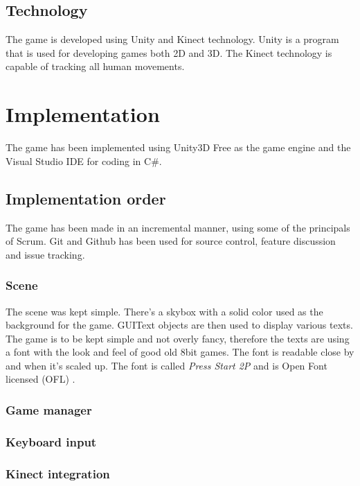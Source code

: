 \documentclass[11pt]{report}
\begin{document}
\section{Technology}
The game is developed using Unity and Kinect technology. Unity is a program that is used for developing games both 2D and 3D. The Kinect technology is capable of tracking all human movements.


\chapter{Implementation}
The game has been implemented using Unity3D Free as the game engine and the Visual Studio IDE for coding in C\#. 

\section{Implementation order}
The game has been made in an incremental manner, using some of the principals of Scrum. Git and Github has been used for source control, feature discussion and issue tracking. 

\subsection{Scene}
The scene was kept simple. There's a skybox with a solid color used as the background for the game. GUIText objects are then used to display various texts. The game is to be kept simple and not overly fancy, therefore the texts are using a font with the look and feel of good old 8bit games. The font is readable close by and when it's scaled up. The font is called \emph{Press Start 2P} and is Open Font licensed (OFL) \cite{2pfont}. 

\subsection{Game manager}


\subsection{Keyboard input}

\subsection{Kinect integration}
\end{document}
